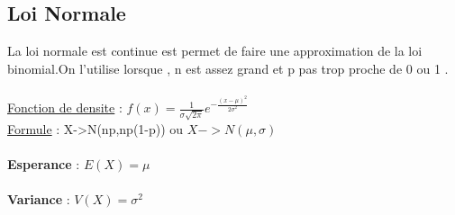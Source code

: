 \documentclass[a4paper,8pt,openany]{book}
\begin{document}
\subsection{Loi Normale}
La loi normale est continue est permet de faire une approximation de la loi binomial.On l'utilise lorsque , n est assez grand et p pas trop proche de 0 ou 1 .\\
\\
\underline{Fonction de densite} : $f(x)=\frac{1}{\sigma\sqrt{2\pi}}e^{-\frac{(x-\mu)^2}{2\sigma^2}}$
\\
\underline{Formule} :  X->N(np,np(1-p)) ou $X->N(\mu,\sigma)$\\
\\\textbf{Esperance} : $E(X)= \mu $\\
\\
\textbf{Variance} : $V(X)=\sigma^2$
\end{document}
